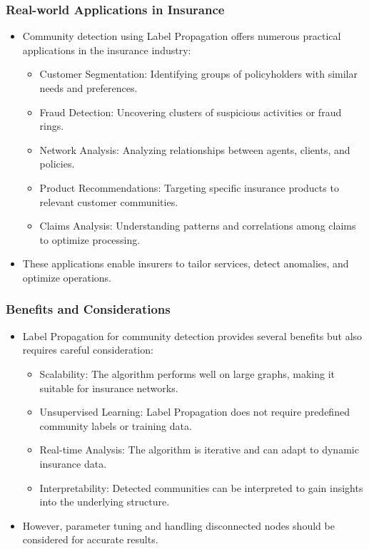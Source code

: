 \begin{frame}[fragile]\frametitle{Real-world Applications in Insurance}
\begin{itemize}
\item Community detection using Label Propagation offers numerous practical applications in the insurance industry:
\begin{itemize}
\item Customer Segmentation: Identifying groups of policyholders with similar needs and preferences.
\item Fraud Detection: Uncovering clusters of suspicious activities or fraud rings.
\item Network Analysis: Analyzing relationships between agents, clients, and policies.
\item Product Recommendations: Targeting specific insurance products to relevant customer communities.
\item Claims Analysis: Understanding patterns and correlations among claims to optimize processing.
\end{itemize}
\item These applications enable insurers to tailor services, detect anomalies, and optimize operations.
\end{itemize}
\end{frame}

\begin{frame}[fragile]\frametitle{Benefits and Considerations}
\begin{itemize}
\item Label Propagation for community detection provides several benefits but also requires careful consideration:
\begin{itemize}
\item Scalability: The algorithm performs well on large graphs, making it suitable for insurance networks.
\item Unsupervised Learning: Label Propagation does not require predefined community labels or training data.
\item Real-time Analysis: The algorithm is iterative and can adapt to dynamic insurance data.
\item Interpretability: Detected communities can be interpreted to gain insights into the underlying structure.
\end{itemize}
\item However, parameter tuning and handling disconnected nodes should be considered for accurate results.
\end{itemize}
\end{frame}